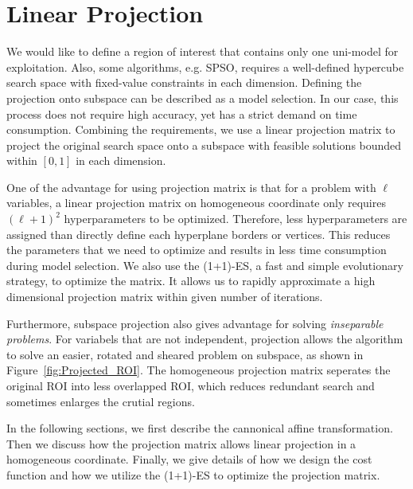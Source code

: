 \chapter{Linear Projection}
\label{chapter:projection}

We would like to define a region of interest that contains only one uni-model for exploitation.
Also, some algorithms, e.g. SPSO, requires a well-defined hypercube search space with fixed-value constraints in each dimension.
Defining the projection onto subspace can be described as a model selection.
In our case, this process does not require high accuracy, yet has a strict demand on time consumption.
Combining the requirements, we use a linear projection matrix to project the original search space 
onto a subspace with feasible solutions bounded within $[0,1]$ in each dimension.

One of the advantage for using projection matrix is that for a problem with $\ell$ variables, 
a linear projection matrix on homogeneous coordinate only requires $(\ell+1)^2$ hyperparameters to be optimized.
Therefore, less hyperparameters are assigned than directly define each hyperplane borders or vertices.  
This reduces the parameters that we need to optimize and results in less time consumption during model selection.
We also use the (1+1)-ES, a fast and simple evolutionary strategy, to optimize the matrix.
It allows us to rapidly approximate a high dimensional projection matrix within given number of iterations.

Furthermore, subspace projection also gives advantage for solving \textit{inseparable problems}.
For variabels that are not independent, projection allows the algorithm
to solve an easier, rotated and sheared problem on subspace, as shown in Figure~\ref{fig:Projected_ROI}.
The homogeneous projection matrix seperates the original ROI into less overlapped ROI, 
which reduces redundant search and sometimes enlarges the crutial regions.

In the following sections, we first describe the cannonical affine transformation.
Then we discuss how the projection matrix allows linear projection in a homogeneous coordinate.
Finally, we give details of how we design the cost function and how we utilize the (1+1)-ES to optimize the projection matrix.

